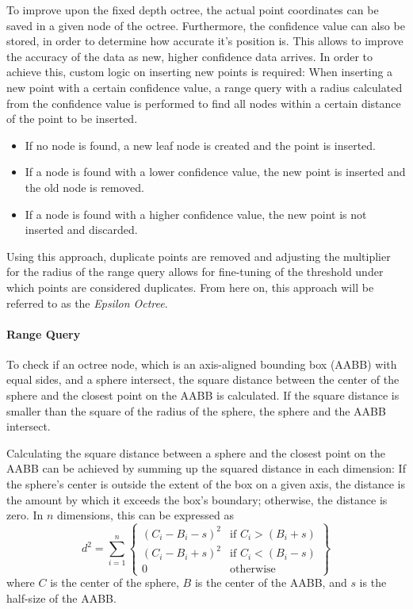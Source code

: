 To improve upon the fixed depth octree, the actual point coordinates can be saved in a given node of the octree.
Furthermore, the confidence value can also be stored, in order to determine how accurate it's position is.
This allows to improve the accuracy of the data as new, higher confidence data arrives.
In order to achieve this, custom logic on inserting new points is required:
When inserting a new point with a certain confidence value, a range query with a radius calculated from the confidence value
is performed to find all nodes within a certain distance of the point to be inserted.
\begin{itemize}
    \item If no node is found, a new leaf node is created and the point is inserted.
    \item If a node is found with a lower confidence value, the new point is inserted and the old node is removed.
    \item If a node is found with a higher confidence value, the new point is not inserted and discarded.
\end{itemize}
Using this approach, duplicate points are removed and adjusting the multiplier for the radius of the range query
allows for fine-tuning of the threshold under which points are considered duplicates.
From here on, this approach will be referred to as the \textit{Epsilon Octree}.

\paragraph{Range Query}
To check if an octree node, which is an axis-aligned bounding box (AABB) with equal sides, and a sphere intersect,
the square distance between the center of the sphere and the closest point on the AABB is calculated.
If the square distance is smaller than the square of the radius of the sphere, the sphere and the AABB intersect.

Calculating the square distance between a sphere and the closest point on the AABB can be achieved by summing up the
squared distance in each dimension:
If the sphere's center is outside the extent of the box on a given axis,
the distance is the amount by which it exceeds the box's boundary; otherwise, the distance is zero.
In $n$ dimensions, this can be expressed as
\begin{equation}
    d^2 = \sum_{i=1}^{n} \left\{
    \begin{array}{ll}
    (C_i - B_i - s)
        ^2                & \text{if } C_i > (B_i + s) \\
        (C_i - B_i + s)^2 & \text{if } C_i < (B_i - s) \\
        0                 & \text{otherwise}
    \end{array}
    \right\}
\end{equation}
where $C$ is the center of the sphere, $B$ is the center of the AABB, and $s$ is the half-size of the AABB\@.
\parencite{glassner_graphics_1994}

